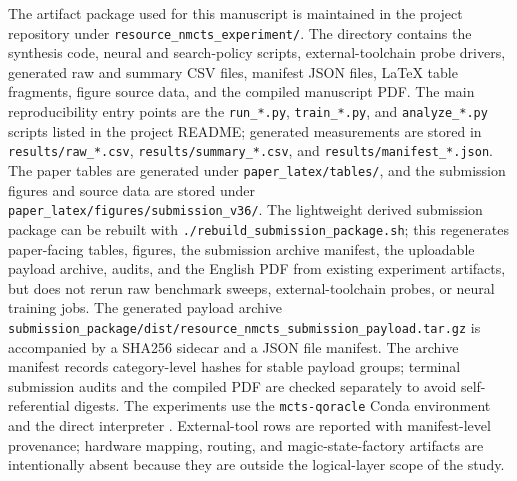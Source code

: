 \documentclass[11pt]{article}
\begin{document}
The artifact package used for this manuscript is maintained in the project
repository under \texttt{resource\_nmcts\_experiment/}.  The directory contains
the synthesis code, neural and search-policy scripts, external-toolchain probe
drivers, generated raw and summary CSV files, manifest JSON files, LaTeX table
fragments, figure source data, and the compiled manuscript PDF.  The main
reproducibility entry points are the \texttt{run\_*.py},
\texttt{train\_*.py}, and \texttt{analyze\_*.py} scripts listed in the project
README; generated measurements are stored in \texttt{results/raw\_*.csv},
\texttt{results/summary\_*.csv}, and \texttt{results/manifest\_*.json}.
The paper tables are generated under \texttt{paper\_latex/tables/}, and the
submission figures and source data are stored under
\texttt{paper\_latex/figures/submission\_v36/}.  The lightweight derived
submission package can be rebuilt with
\texttt{./rebuild\_submission\_package.sh}; this regenerates paper-facing
tables, figures, the submission archive manifest, the uploadable payload
archive, audits, and the English PDF from existing experiment artifacts, but
does not rerun raw benchmark sweeps, external-toolchain probes, or neural
training jobs.  The generated payload archive
\texttt{submission\_package/dist/resource\_nmcts\_submission\_payload.tar.gz}
is accompanied by a SHA256 sidecar and a JSON file manifest.  The archive
manifest records category-level hashes for stable payload groups; terminal
submission audits and the compiled PDF are checked separately to avoid
self-referential digests.  The experiments use the
\texttt{mcts-qoracle} Conda environment and the direct interpreter
.  External-tool rows are
reported with manifest-level provenance; hardware mapping, routing, and
magic-state-factory artifacts are intentionally absent because they are outside
the logical-layer scope of the study.



\end{document}
